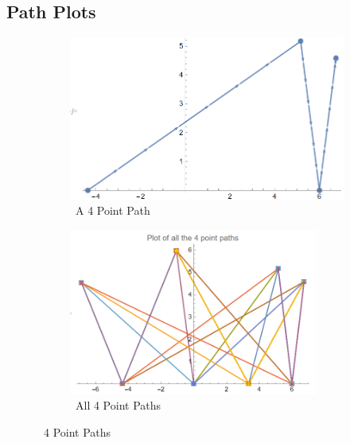\documentclass[12pt,a4paper,twoside]{report}
\begin{document}
\subsection{Path Plots}
\begin{figure}[h]
	\begin{subfigure}[h]{0.5\textwidth}
		\centering
		\includegraphics[width=\textwidth]{4pointpath.png}
		\caption{~A 4 Point Path}
	\end{subfigure}
	\begin{subfigure}[h]{0.5\textwidth}
		\centering
		\includegraphics[width=0.9\textwidth]{4pointall.png}
		\caption{~All 4 Point Paths}
	\end{subfigure}
	\caption{~4 Point Paths}
	
\end{figure}
\end{document}
